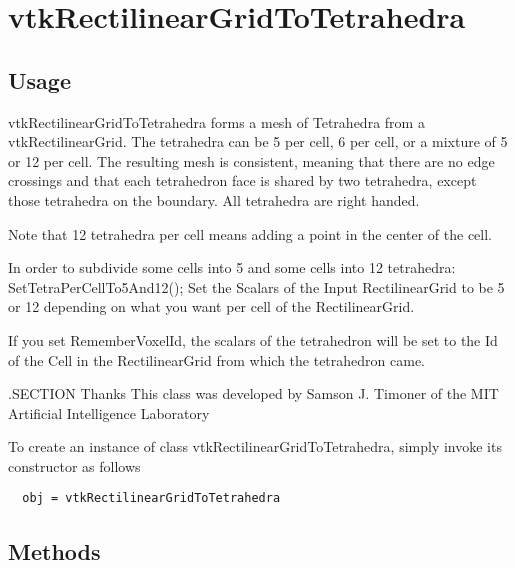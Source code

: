 \section{vtkRectilinearGridToTetrahedra}

\subsection{Usage}

 vtkRectilinearGridToTetrahedra forms a mesh of Tetrahedra from a
 vtkRectilinearGrid.  The tetrahedra can be 5 per cell, 6 per cell,
 or a mixture of 5 or 12 per cell. The resulting mesh is consistent,
 meaning that there are no edge crossings and that each tetrahedron
 face is shared by two tetrahedra, except those tetrahedra on the
 boundary. All tetrahedra are right handed.

 Note that 12 tetrahedra per cell means adding a point in the 
 center of the cell.

 In order to subdivide some cells into 5 and some cells into 12 tetrahedra:
 SetTetraPerCellTo5And12();
 Set the Scalars of the Input RectilinearGrid to be 5 or 12
 depending on what you want per cell of the RectilinearGrid.

 If you set RememberVoxelId, the scalars of the tetrahedron
 will be set to the Id of the Cell in the RectilinearGrid from which
 the tetrahedron came.

 .SECTION Thanks
    This class was developed by Samson J. Timoner of the 
    MIT Artificial Intelligence Laboratory


To create an instance of class vtkRectilinearGridToTetrahedra, simply
invoke its constructor as follows
\begin{verbatim}
  obj = vtkRectilinearGridToTetrahedra
\end{verbatim}
\subsection{Methods}

